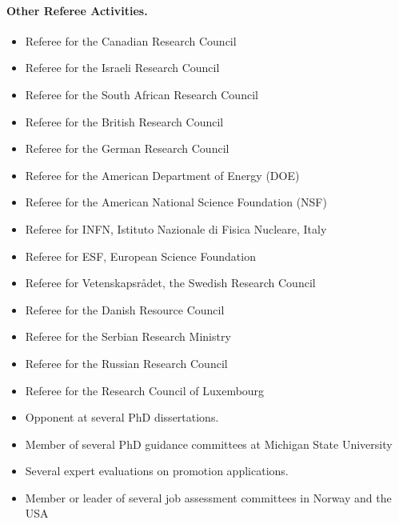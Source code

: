 \documentclass[%
oneside,                 %
final,                   %
10pt]{article}
\begin{document}
\noindent
\paragraph{Other Referee Activities.}
\begin{itemize}
\item Referee for the Canadian Research Council

\item Referee for the Israeli Research Council

\item Referee for the South African Research Council

\item Referee for the British Research Council

\item Referee for the German Research Council

\item Referee for the American Department of Energy (DOE)

\item Referee for the American National Science Foundation (NSF)

\item Referee for INFN, Istituto Nazionale di Fisica Nucleare, Italy

\item Referee for ESF, European Science Foundation

\item Referee for Vetenskapsrådet, the Swedish Research Council

\item Referee for the Danish Resource Council

\item Referee for the Serbian Research Ministry

\item Referee for the Russian Research Council

\item Referee for the Research Council of Luxembourg

\item Opponent at several PhD dissertations.

\item Member of several  PhD guidance committees at Michigan State University

\item Several expert evaluations on promotion applications.

\item Member or leader of several job assessment committees in Norway and the USA
\end{itemize}
\end{document}
